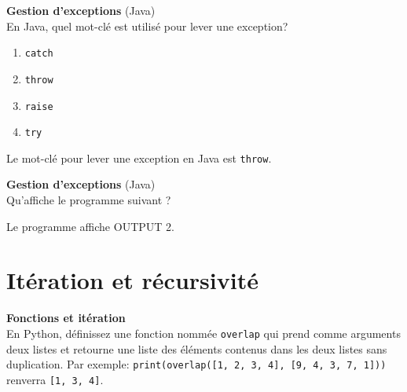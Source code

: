 \begin{Exercice}[5 minutes]\textbf{Gestion d'exceptions} (Java)\\

    En Java, quel mot-clé est utilisé pour lever une exception?

    \begin{enumerate}
        \item \texttt{catch}
        \item \texttt{throw}
        \item \texttt{raise} 
        \item \texttt{try}
    \end{enumerate}
    
    \begin{solution}   
    Le mot-clé pour lever une exception en Java est \lstinline{throw}.
        
    \end{solution}
        
 \end{Exercice}

 \begin{Exercice}[5 minutes]\textbf{Gestion d'exceptions} (Java)\\
    Qu'affiche le programme suivant ?
    
        
        \begin{solution}   
        Le programme affiche OUTPUT 2.             
        \end{solution}
        
 \end{Exercice}



    



\section{Itération et récursivité}

\begin{Exercice}[10 minutes] \textbf{Fonctions et itération}
    \\
    En Python, définissez une fonction nommée \lstinline{overlap} qui prend comme arguments deux listes et retourne une liste des éléments contenus dans les deux listes sans duplication.
    Par exemple:
    \lstinline{print(overlap([1, 2, 3, 4], [9, 4, 3, 7, 1]))} renverra \lstinline{[1, 3, 4]}.

    \begin{solution}
        
    \end{solution}
\end{Exercice}

